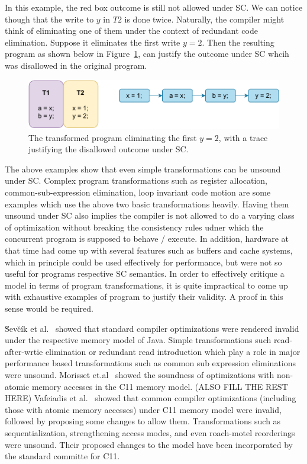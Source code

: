     In this example, the red box outcome is still not allowed under SC. We can notice though that the write to $y$ in $T2$ is done twice. 
    Naturally, the compiler might think of eliminating one of them under the context of redundant code elimination. 
    Suppose it eliminates the first write $y=2$. 
    Then the resulting program as shown below in Figure~\ref{intro:Example3(b)}, can justify the outcome under SC whcih was disallowed in the original program.
    \begin{figure}[H]
        \centering
        \includegraphics[scale=1]{2.Background/SC_Example2(b).pdf}
        \caption{The transformed program eliminating the first $y=2$, with a trace justifying the disallowed outcome under SC.}
        \label{intro:Example3(b)}
    \end{figure}

    The above examples show that even simple transformations can be unsound under SC. Complex program transformations such as register allocation, common-sub-expression elimination, loop invariant code motion are some examples which use the above two basic transformations heavily. 
    Having them unsound under SC also implies the compiler is not allowed to do a varying class of optimization without breaking the consistency rules udner which the concurrent program is supposed to behave / execute. 
    In addition, hardware at that time had come up with several features such as buffers and cache systems, which in principle could be used effectively for performance, but were not so useful for programs respective SC semantics. 
    In order to effectively critique a model in terms of program transformations, it is quite impractical to come up with exhaustive examples of program to justify their validity.
    A proof in this sense would be required.  

    \u{S}ev\u{c}\'{i}k et al.~\cite{SevcikJ} showed that standard compiler optimizations were rendered invalid under the respective memory model of Java. Simple transformations such read-after-wrtie elimination or redundant read introduction which play a role in major performance based transformations such as common sub expression eliminations were unsound. 
    Morisset et.al~\cite{Morisset} showed the soundness of optimizations with non-atomic memory accesses in the C11 memory model. (ALSO FILL THE REST HERE) 
    Vafeiadis et al.~\cite{VafeiadisV} showed that common compiler optimizations (including those with atomic memory accesses) under C11 memory model were invalid, followed by proposing some changes to allow them. Transformations such as sequentialization, strengthening access modes, and even roach-motel reorderings were unsound. Their proposed changes to the model have been incorporated by the standard committe for C11. 


